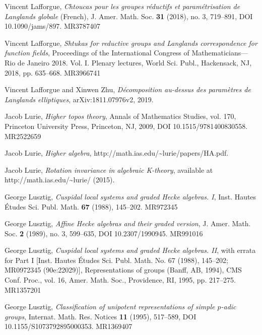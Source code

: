 \begin{refs}
\item[{[La18a]}] Vincent Lafforgue, \emph{Chtoucas pour les groupes r\'eductifs et param\'etrisation de Langlands globale} (French), J. Amer. Math. Soc. \textbf{31} (2018), no. 3, 719--891, DOI 10.1090/jams/897. MR3787407
\item[{[La18b]}] Vincent Lafforgue, \emph{Shtukas for reductive groups and Langlands correspondence for function fields}, Proceedings of the International Congress of Mathematicians---Rio de Janeiro 2018. Vol. I. Plenary lectures, World Sci. Publ., Hackensack, NJ, 2018, pp. 635--668. MR3966741
\item[{[LaZ19]}] Vincent Lafforgue and Xinwen Zhu, \emph{D\'ecomposition au-dessus des param\`etres de Langlands elliptiques}, arXiv:1811.07976v2, 2019.
\item[{[Lur1]}] Jacob Lurie, \emph{Higher topos theory}, Annals of Mathematics Studies, vol. 170, Princeton University Press, Princeton, NJ, 2009, DOI 10.1515/9781400830558. MR2522659
\item[{[Lur2]}] Jacob Lurie, \emph{Higher algebra}, http://math.ias.edu/\textasciitilde lurie/papers/HA.pdf.
\item[{[Lur3]}] Jacob Lurie, \emph{Rotation invariance in algebraic K-theory}, available at http://math.ias.edu/\textasciitilde lurie/ (2015).
\item[{[Lu88]}] George Lusztig, \emph{Cuspidal local systems and graded Hecke algebras. I}, Inst. Hautes \'Etudes Sci. Publ. Math. \textbf{67} (1988), 145--202. MR972345
\item[{[Lu89]}] George Lusztig, \emph{Affine Hecke algebras and their graded version}, J. Amer. Math. Soc. \textbf{2} (1989), no. 3, 599--635, DOI 10.2307/1990945. MR991016
\item[{[Lu95a]}] George Lusztig, \emph{Cuspidal local systems and graded Hecke algebras. II}, with errata for Part I [Inst. Hautes \'Etudes Sci. Publ. Math. No. 67 (1988), 145--202; MR0972345 (90e:22029)], Representations of groups (Banff, AB, 1994), CMS Conf. Proc., vol. 16, Amer. Math. Soc., Providence, RI, 1995, pp. 217--275. MR1357201
\item[{[Lu95b]}] George Lusztig, \emph{Classification of unipotent representations of simple $p$-adic groups}, Internat. Math. Res. Notices \textbf{11} (1995), 517--589, DOI 10.1155/S1073792895000353. MR1369407



\end{refs}
